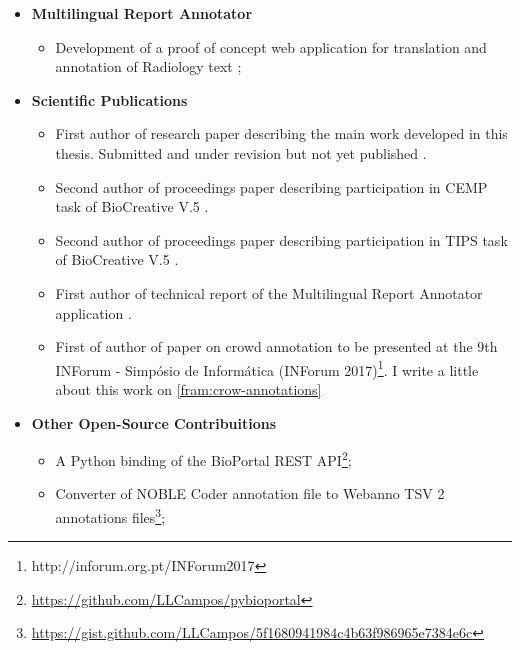 \begin{itemize}
\item \textbf{Multilingual Report Annotator}
\begin{itemize}
	\item Development of a proof of concept web application for translation and annotation of Radiology text \citep{Campos2017};
\end{itemize}
	
\item \textbf{Scientific Publications}
	\begin{itemize}
		\item First author of research paper describing the main work developed in this thesis. Submitted and under revision but not yet published \citep{Campos}.
		\item Second author of proceedings paper describing participation in CEMP task of BioCreative V.5 \citep{Lamurias2017}.
		\item Second author of proceedings paper describing participation in TIPS task of BioCreative V.5 \citep{Couto2017}.	
		\item First author of technical report of the Multilingual Report Annotator application \citep{Campos2017}.
		\item First of author of paper on crowd annotation \citep{Campos2017a} to be presented at the 9th INForum - Simpósio de Informática (INForum 2017)\footnote{http://inforum.org.pt/INForum2017}. I write a little about this work on \ref{fram:crow-annotations}
	\end{itemize}
	
\item \textbf{Other Open-Source Contribuitions}
	\begin{itemize}
		\item A Python binding of the BioPortal REST API\footnote{\url{https://github.com/LLCampos/pybioportal}};
		\item Converter of NOBLE Coder annotation file to Webanno TSV 2 annotations files\footnote{\url{https://gist.github.com/LLCampos/5f1680941984c4b63f986965e7384e6c}};
	\end{itemize}

	 
\end{itemize}


